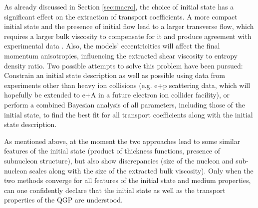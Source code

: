 As already discussed in Section \ref{sec:macro}, the choice of initial state has a significant effect on the extraction of transport coefficients. A more compact initial state and the presence of initial flow lead to a larger transverse flow, which requires a larger bulk viscosity to compensate for it and produce agreement with experimental data \cite{Schenke:2018fci}. Also, the models' eccentricities will affect the final momentum anisotropies, influencing the extracted shear viscosity to entropy density ratio. Two possible attempts to solve this problem have been pursued: Constrain an initial state description as well as possible using data from experiments other than heavy ion collisions (e.g. e+p scattering data, which will hopefully be extended to e+A in a future electron ion collider facility), or perform a combined Bayesian analysis of all parameters, including those of the initial state, to find the best fit for all transport coefficients along with the initial state description.

As mentioned above, at the moment the two approaches lead to some similar features of the initial state (product of thickness functions, presence of subnucleon structure), but also show discrepancies (size of the nucleon and sub-nucleon scales along with the size of the extracted bulk viscosity). Only when the two methods converge for all features of the initial state and medium properties, can one confidently declare that the initial state as well as the transport properties of the QGP are understood.